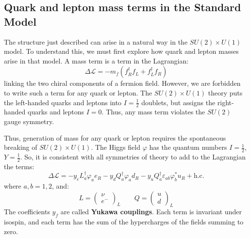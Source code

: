 \documentclass[../../main/main.tex]{subfiles}
\begin{document}
\subsection{Quark and lepton mass terms in the Standard Model}
The structure just described can arise in a natural way in the \( SU(2) \times U(1) \) model. To understand this, we must first explore how quark and lepton masses arise in that model. A mass term is a term in the Lagrangian:
\begin{equation}
	\Delta \mathcal{L}
	=
	- m_f (f^{\dag}_R f_L + f^{\dag}_L f_R)
	\label{eq:}
\end{equation}
linking the two chiral components of a fermion field. However, we are forbidden to write such a term for any quark or lepton. The \( SU(2) \times U(1) \) theory puts the left-handed quarks and leptons into \( I = \frac{1}{2} \) doublets, but assigns the right-handed quarks and leptons \( I=0 \). Thus, any mass term violates the \( SU(2) \) gauge symmetry.

Thus, generation of mass for any quark or lepton requires the spontaneous breaking of \( SU(2) \times U(1) \). The Higgs field \( \varphi \) has the quantum numbers \( I = \frac{1}{2} \), \( Y = \frac{1}{2} \). So, it is consistent with all symmetries of theory to add to the Lagrangian the terms:
\begin{equation}
	\Delta \mathcal{L}
	=
	- y_e L^{\dag}_a \varphi_a e_R
	- y_d Q^{\dag}_a \varphi_a d_R
	- y_u Q^{\dag}_a \varepsilon_{ab} \varphi_b^{*} u_R
	+ \text{h.c.}
	\label{eq:L18_QALMTL}
\end{equation}
where \( a,b = 1,2 \), and:
\begin{equation}
	L
	=
	\begin{pmatrix}
		\nu \\
		e^-
	\end{pmatrix}_L
	\qquad
	Q
	=
	\begin{pmatrix}
		u \\
		d
	\end{pmatrix}_L
	\label{eq:}
\end{equation}
The coefficients \( y_f \) are called \textbf{Yukawa couplings}. Each term is invariant under isospin, and each term has the sum of the hypercharges of the fields summing to zero.
\end{document}
